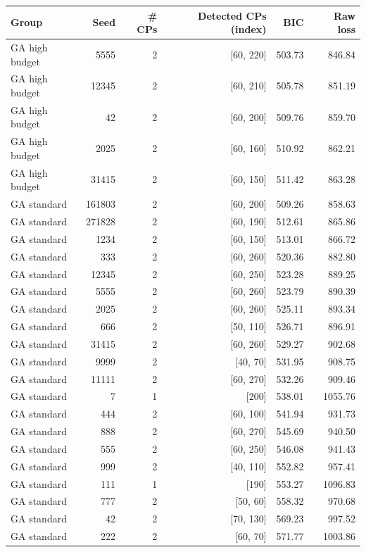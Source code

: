 \begin{tabular}{lrrrrr}
\hline
Group & Seed & \# CPs & Detected CPs (index) & BIC & Raw loss \\
\hline
GA high budget & 5555 & 2 & [60, 220] & 503.73 & 846.84 \\
GA high budget & 12345 & 2 & [60, 210] & 505.78 & 851.19 \\
GA high budget & 42 & 2 & [60, 200] & 509.76 & 859.70 \\
GA high budget & 2025 & 2 & [60, 160] & 510.92 & 862.21 \\
GA high budget & 31415 & 2 & [60, 150] & 511.42 & 863.28 \\
GA standard & 161803 & 2 & [60, 200] & 509.26 & 858.63 \\
GA standard & 271828 & 2 & [60, 190] & 512.61 & 865.86 \\
GA standard & 1234 & 2 & [60, 150] & 513.01 & 866.72 \\
GA standard & 333 & 2 & [60, 260] & 520.36 & 882.80 \\
GA standard & 12345 & 2 & [60, 250] & 523.28 & 889.25 \\
GA standard & 5555 & 2 & [60, 260] & 523.79 & 890.39 \\
GA standard & 2025 & 2 & [60, 260] & 525.11 & 893.34 \\
GA standard & 666 & 2 & [50, 110] & 526.71 & 896.91 \\
GA standard & 31415 & 2 & [60, 260] & 529.27 & 902.68 \\
GA standard & 9999 & 2 & [40, 70] & 531.95 & 908.75 \\
GA standard & 11111 & 2 & [60, 270] & 532.26 & 909.46 \\
GA standard & 7 & 1 & [200] & 538.01 & 1055.76 \\
GA standard & 444 & 2 & [60, 100] & 541.94 & 931.73 \\
GA standard & 888 & 2 & [60, 270] & 545.69 & 940.50 \\
GA standard & 555 & 2 & [60, 250] & 546.08 & 941.43 \\
GA standard & 999 & 2 & [40, 110] & 552.82 & 957.41 \\
GA standard & 111 & 1 & [190] & 553.27 & 1096.83 \\
GA standard & 777 & 2 & [50, 60] & 558.32 & 970.68 \\
GA standard & 42 & 2 & [70, 130] & 569.23 & 997.52 \\
GA standard & 222 & 2 & [60, 70] & 571.77 & 1003.86 \\
\hline
\end{tabular}
